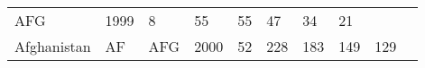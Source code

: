 \documentclass[]{article}
\begin{document}
\begin{longtable}[]{@{}llllllllll@{}}
\begin{minipage}[t]{0.04\columnwidth}
AFG\strut
\end{minipage} & \begin{minipage}[t]{0.04\columnwidth}\raggedright
1999\strut
\end{minipage} & \begin{minipage}[t]{0.08\columnwidth}\raggedright
8\strut
\end{minipage} & \begin{minipage}[t]{0.09\columnwidth}\raggedright
55\strut
\end{minipage} & \begin{minipage}[t]{0.09\columnwidth}\raggedright
55\strut
\end{minipage} & \begin{minipage}[t]{0.09\columnwidth}\raggedright
47\strut
\end{minipage} & \begin{minipage}[t]{0.09\columnwidth}\raggedright
34\strut
\end{minipage} & \begin{minipage}[t]{0.09\columnwidth}\raggedright
21\strut
\end{minipage}\tabularnewline
\begin{minipage}[t]{0.08\columnwidth}\raggedright
Afghanistan\strut
\end{minipage} & \begin{minipage}[t]{0.04\columnwidth}\raggedright
AF\strut
\end{minipage} & \begin{minipage}[t]{0.04\columnwidth}\raggedright
AFG\strut
\end{minipage} & \begin{minipage}[t]{0.04\columnwidth}\raggedright
2000\strut
\end{minipage} & \begin{minipage}[t]{0.08\columnwidth}\raggedright
52\strut
\end{minipage} & \begin{minipage}[t]{0.09\columnwidth}\raggedright
228\strut
\end{minipage} & \begin{minipage}[t]{0.09\columnwidth}\raggedright
183\strut
\end{minipage} & \begin{minipage}[t]{0.09\columnwidth}\raggedright
149\strut
\end{minipage} & \begin{minipage}[t]{0.09\columnwidth}\raggedright
129\strut
\end{minipage} & \begin{minipage}[t]{0.09\columnwidth}\raggedright

\end{minipage}
\end{longtable}
\end{document}
